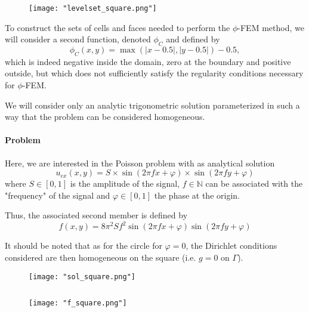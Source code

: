 \begin{figure}[H]
	\centering
	\texttt{[image: "levelset\_square.png"]}
	\label{levelset_square}
\end{figure} 

To construct the sets of cells and faces needed to perform the $\phi$-FEM method, we will consider a second function, denoted $\phi_C$ and defined by
\begin{equation*}
	\phi_C(x,y)=\max(|x-0.5|,|y-0.5|)-0.5,
\end{equation*}
which is indeed negative inside the domain, zero at the boundary and positive outside, but which does not sufficiently satisfy the regularity conditions necessary for $\phi$-FEM.

We will consider only an analytic trigonometric solution parameterized in such a way that the problem can be considered homogeneous.

\paragraph{Problem} \label{Corr.pb.square.1}

Here, we are interested in the Poisson problem with as analytical solution
\begin{equation*}
	u_{ex}(x,y)=S\times\sin\left(2\pi fx+\varphi\right)\times\sin\left(2\pi fy+\varphi\right)
\end{equation*}
where $S\in[0,1]$ is the amplitude of the signal, $f\in\mathbb{N}$ can be associated with the "frequency" of the signal and $\varphi\in[0,1]$ the phase at the origin.

Thus, the associated second member is defined by
\begin{equation*}
	f(x,y)=8\pi^2 Sf^2\sin\left(2\pi fx + \varphi\right)\sin\left(2\pi fy + \varphi\right)
\end{equation*}

\begin{Rem}
	It should be noted that as for the circle for $\varphi=0$, the Dirichlet conditions considered are then homogeneous on the square (i.e. $g=0$ on $\Gamma$).
\end{Rem}

\begin{minipage}{0.48\linewidth}
	\begin{figure}[H]
		\centering
		\texttt{[image: "sol\_square.png"]}
		\label{sol_square}
	\end{figure} 
\end{minipage} $\qquad$
\begin{minipage}{0.48\linewidth}
	\begin{figure}[H]
		\centering
		\texttt{[image: "f\_square.png"]}
		\label{f_square}
	\end{figure} 
\end{minipage}


